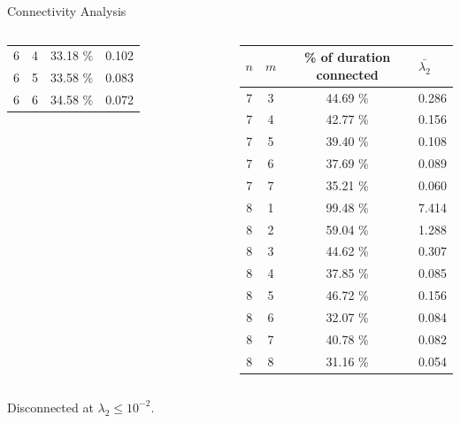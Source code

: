 \begin{frame}{Connectivity Analysis}
\begin{columns}
\begin{table}
\begin{tabular}{cccl}
                6                   & 4   & 33.18 \%                 & 0.102             \\
                6                   & 5   & 33.58 \%                 & 0.083             \\
                6                   & 6   & 34.58 \%                 & 0.072             \\
            \end{tabular}
        \end{table}
        \begin{table}
            \begin{tabular}{cccl}
                \hline
                $n$                 & $m$ & \% of duration connected & $\bar{\lambda_2}$ \\
                \hline
                7                   & 3   & 44.69 \%                 & 0.286             \\
                7                   & 4   & 42.77 \%                 & 0.156             \\
                7                   & 5   & 39.40 \%                 & 0.108             \\
                7                   & 6   & 37.69 \%                 & 0.089             \\
                7                   & 7   & 35.21 \%                 & 0.060             \\
                8                   & 1   & 99.48 \%                 & 7.414             \\
                \rowcolor{yellow} 8 & 2   & 59.04 \%                 & 1.288             \\
                8                   & 3   & 44.62 \%                 & 0.307             \\
                8                   & 4   & 37.85 \%                 & 0.085             \\
                8                   & 5   & 46.72 \%                 & 0.156             \\
                8                   & 6   & 32.07 \%                 & 0.084             \\
                8                   & 7   & 40.78 \%                 & 0.082             \\
                8                   & 8   & 31.16 \%                 & 0.054             \\
            \end{tabular}
        \end{table}
    \end{columns}
    Disconnected at $\lambda_2 \le 10^{-2}$.
\end{frame}


